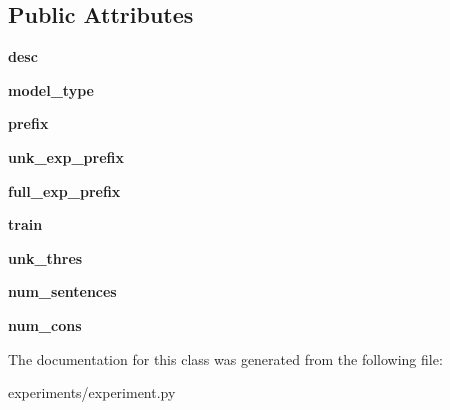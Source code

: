 \subsection*{Public Attributes}
\begin{DoxyCompactItemize}
\item 
\hypertarget{classexperiment_1_1Experiment_add351d39019d095acbc5837d42c1a483}{
{\bfseries desc}}
\label{classexperiment_1_1Experiment_add351d39019d095acbc5837d42c1a483}

\item 
\hypertarget{classexperiment_1_1Experiment_adbdb4aa150e05a4c8322d766bc62feac}{
{\bfseries model\_\-type}}
\label{classexperiment_1_1Experiment_adbdb4aa150e05a4c8322d766bc62feac}

\item 
\hypertarget{classexperiment_1_1Experiment_af497697aacea28828b90d6f9606dbf5b}{
{\bfseries prefix}}
\label{classexperiment_1_1Experiment_af497697aacea28828b90d6f9606dbf5b}

\item 
\hypertarget{classexperiment_1_1Experiment_a86a616c409d1d123b67e15595b36f500}{
{\bfseries unk\_\-exp\_\-prefix}}
\label{classexperiment_1_1Experiment_a86a616c409d1d123b67e15595b36f500}

\item 
\hypertarget{classexperiment_1_1Experiment_a8fefbeec3c4e7e2596a58f308cead9b2}{
{\bfseries full\_\-exp\_\-prefix}}
\label{classexperiment_1_1Experiment_a8fefbeec3c4e7e2596a58f308cead9b2}

\item 
\hypertarget{classexperiment_1_1Experiment_a9c3e2ec73c6adcb174f7d182a30ca71c}{
{\bfseries train}}
\label{classexperiment_1_1Experiment_a9c3e2ec73c6adcb174f7d182a30ca71c}

\item 
\hypertarget{classexperiment_1_1Experiment_aa43328b8f77bbc848302b13b02ba6bbc}{
{\bfseries unk\_\-thres}}
\label{classexperiment_1_1Experiment_aa43328b8f77bbc848302b13b02ba6bbc}

\item 
\hypertarget{classexperiment_1_1Experiment_ad0b7a95c9f9bc79066b39f679d7764a2}{
{\bfseries num\_\-sentences}}
\label{classexperiment_1_1Experiment_ad0b7a95c9f9bc79066b39f679d7764a2}

\item 
\hypertarget{classexperiment_1_1Experiment_a9f480a3647686b912674ca1cb021ed12}{
{\bfseries num\_\-cons}}
\label{classexperiment_1_1Experiment_a9f480a3647686b912674ca1cb021ed12}

\end{DoxyCompactItemize}


The documentation for this class was generated from the following file:\begin{DoxyCompactItemize}
\item 
experiments/experiment.py\end{DoxyCompactItemize}
